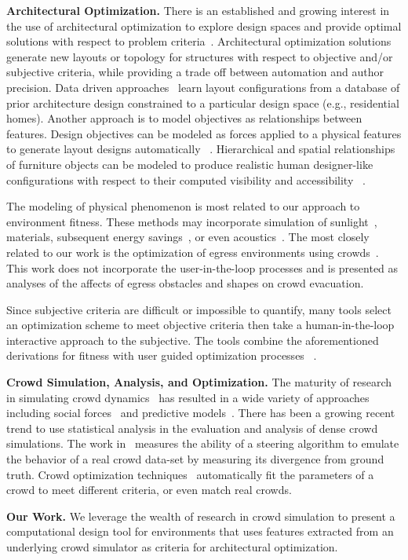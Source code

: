 \noindent \textbf{Architectural Optimization.} There is an established and growing interest in the use of architectural optimization to explore design spaces and provide optimal solutions with respect to problem criteria~\cite{block2014advances,pottmann2014architectural}. 
Architectural optimization solutions generate new layouts or topology for structures with respect to objective and/or subjective criteria, while providing a trade off between automation and author precision.  Data driven approaches~\cite{Merrell:2010:CRB:1882261.1866203} learn layout configurations from a database of prior architecture design constrained to a particular design space (e.g., residential homes).  Another approach is to model objectives as relationships between features. Design objectives can be modeled as forces applied to a physical features to generate layout designs automatically ~\cite{arvin2002modeling}.  Hierarchical and spatial relationships of furniture objects can be modeled to produce realistic human designer-like configurations with respect to their computed visibility and accessibility ~\cite{craigyu2011furniture}.  

The modeling of physical phenomenon is most related to our approach to environment fitness.  These methods may incorporate simulation of sunlight~\cite{yi2014performance}, materials, subsequent energy savings~\cite{caldas2002design}, or even acoustics~\cite{bassuet2014computational}.  The most closely related to our work is the optimization of egress environments using crowds~\cite{johansson2007pedestrian, jiang2014obstacle}.  This work does not incorporate the user-in-the-loop processes and is presented as analyses of the affects of egress obstacles and shapes on crowd evacuation.

Since subjective criteria are difficult or impossible to quantify, many tools select an optimization scheme to meet objective criteria then take a human-in-the-loop interactive approach to the subjective.  The tools combine the aforementioned derivations for fitness with user guided optimization processes ~\cite{shi2013performance,turrin2011design,Michalek02interactivedesign}. 

\noindent \textbf{Crowd Simulation, Analysis, and Optimization.} The maturity of research in simulating crowd dynamics~\cite{badlerBook,DBLP:books/daglib/0030710} has resulted in a wide variety of approaches including social forces~\cite{helbing2000simulating} and predictive models~\cite{ORCA,ppr}. There has been a growing recent trend to use statistical analysis in the evaluation and analysis of dense crowd simulations.  The work in~\cite{guy2012statistical,Pettre:2009:EMS:1599470.1599495} measures the ability of a steering algorithm to emulate the behavior of a real crowd data-set by measuring its divergence from ground truth.  Crowd optimization techniques~\cite{paramFitting,sca.20141129} automatically fit the parameters of a crowd to meet different criteria, or even match real crowds. 

\noindent \textbf{Our Work.} We leverage the wealth of research in crowd simulation to present a computational design tool for environments that uses features extracted from an underlying crowd simulator as criteria for architectural optimization.  
